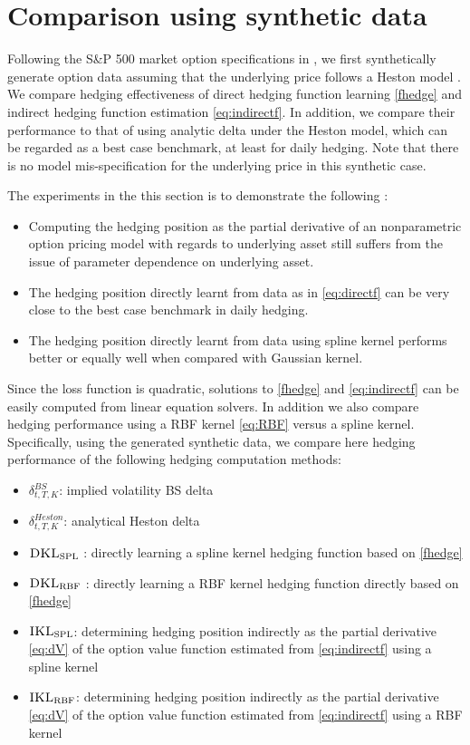 \documentclass[letterpaper,12pt,titlepage,oneside,final]{book}
\numberwithin{equation}{section}
\theoremstyle{definition}
\newcommand{\DKLs}{\bf\textsc{DKL}_{\text{SPL}}}
\newcommand{\DKLg}{\bf\textsc{DKL}_{\text{RBF}}}
\newcommand{\IKLs}{\bf\textsc{IKL}_{\text{SPL}}}
\newcommand{\IKLg}{\bf\textsc{IKL}_{\text{RBF}}}
\begin{document}
\section{Comparison using synthetic data}\label{sec:Synexperiment}
Following the S\&P 500  market option specifications in \citep{hull2006options},  we first synthetically generate option data assuming that the underlying price follows a Heston model \citep{heston1993closed}.
We  compare hedging effectiveness of direct hedging function learning \eqref{fhedge}  and indirect hedging function estimation  \eqref{eq:indirectf}. In addition, we compare their performance to that of using  analytic delta under the  Heston model, which can be regarded as a best case benchmark, at least for daily hedging. Note that there is no model mis-specification  for the underlying price in this synthetic case.

The experiments in the this section is to demonstrate the following :
\begin{itemize}
\item Computing the hedging position as the partial derivative of an nonparametric option pricing model with regards to underlying asset still suffers from the issue of parameter dependence on underlying asset.
\item The hedging position directly learnt from data as in \eqref{eq:directf} can be very close to the  best case benchmark in daily hedging.
\item The hedging position directly learnt from data using spline kernel performs better or equally well when compared with Gaussian kernel.
\end{itemize}

Since the loss function is  quadratic, solutions to \eqref{fhedge} and \eqref{eq:indirectf}
can be easily computed from linear equation solvers.
In addition we also compare hedging performance using a RBF kernel \eqref{eq:RBF} versus a spline kernel.
Specifically, using the generated synthetic data, we compare here hedging performance  of the following hedging computation methods:
 \begin{itemize}
 \item  $\delta^{BS}_{t,T,K}$:  implied  volatility BS delta
 \item $\delta^{Heston}_{t,T,K}$:   analytical Heston delta
 \item $\DKLs$ : directly learning a spline kernel hedging  function based on \eqref{fhedge}
 \item $\DKLg$ : directly learning a RBF kernel hedging  function directly based on \eqref{fhedge}
 \item ${\IKLs}$: determining hedging position indirectly  as the partial derivative \eqref{eq:dV} of the  option value function   estimated from \eqref{eq:indirectf} using a spline kernel

\item ${\IKLg}$: determining hedging position indirectly  as the partial derivative \eqref{eq:dV} of the  option value function   estimated from \eqref{eq:indirectf} using a RBF kernel

\end{itemize}
\end{document}
